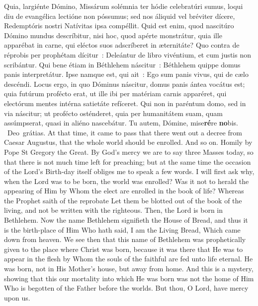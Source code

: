 {{\begin{parcolumns}[rulebetween,colwidths={1=.51\linewidth}]{2}
{Quia, largiénte Dómino, Missárum solémnia ter hódie celebratúri sumus, loqui diu de evangélica lectióne non póssumus; sed nos áliquid vel bréviter dícere, Redemptóris nostri Natívitas ipsa compéllit. Quid est enim, quod nascitúro Dómino mundus descríbitur, nisi hoc, quod apérte monstrátur, quia ille apparébat in carne, qui eléctos suos adscríberet in æternitáte? Quo contra de réprobis per prophétam dícitur~: Deleántur de libro vivéntium, et cum justis non scribántur. Qui bene étiam in Béthlehem náscitur~: Béthlehem quippe domus panis interpretátur. Ipse namque est, qui ait~: Ego sum panis vivus, qui de cælo descéndi. Locus ergo, in quo Dóminus náscitur, domus panis ántea vocátus est; quia futúrum profécto erat, ut ille ibi per matériam carnis apparéret, qui electórum mentes intérna satietáte refíceret. Qui non in paréntum domo, sed in via náscitur; ut profécto osténderet, quia per humanitátem suam, quam assúmpserat, quasi in aliéno nascebátur.
      Tu autem, Dómine, mise\textbf{ré}re \textbf{no}bis.
      \Rbar{}~Deo~grátias.}
    {At that time, it came to pass that there went out a decree from Caesar Augustus, that the whole world should be enrolled. And so on.
Homily by Pope St Gregory the Great.
By God's mercy we are to say three Masses today, so that there is not much time left for preaching; but at the same time the occasion of the Lord's Birth-day itself obliges me to speak a few words. I will first ask why, when the Lord was to be born, the world was enrolled? Was it not to herald the appearing of Him by Whom the elect are enrolled in the book of life? Whereas the Prophet saith of the reprobate Let them be blotted out of the book of the living, and not be written with the righteous. Then, the Lord is born in Bethlehem. Now the name Bethlehem signifieth the House of Bread, and thus it is the birth-place of Him Who hath said, I am the Living Bread, Which came down from heaven. We see then that this name of Bethlehem was prophetically given to the place where Christ was born, because it was there that He was to appear in the flesh by Whom the souls of the faithful are fed unto life eternal. He was born, not in His Mother's house, but away from home. And this is a mystery, showing that this our mortality into which He was born was not the home of Him Who is begotten of the Father before the worlds.
      But thou, O Lord, have mercy upon us.}
    \end{parcolumns}

  }

  {
    \medskip

}}
